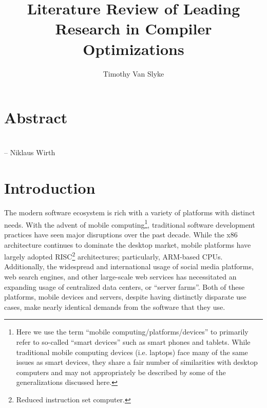 \documentclass[nobib]{tufte-handout}
\title{Literature Review of Leading Research in Compiler Optimizations}
\author{Timothy Van Slyke}
\begin{document}
\maketitle
\section*{Abstract}
\begin{abstract}
\lipsum[1]
\end{abstract}

\section*{}
\newline\noindent\hfill{-- Niklaus Wirth} \\
\section{Introduction}
The modern software ecosystem is rich with a variety of platforms with distinct needs.  With the advent of mobile computing\footnote{Here we use the term ``mobile computing/platforms/devices'' to primarily refer to so-called ``smart devices'' such as smart phones and tablets.  While traditional mobile computing devices (i.e. laptops) face many of the same issues as smart devices, they share a fair number of similarities with desktop computers and may not appropriately be described by some of the generalizations discussed here.}, traditional software development practices have seen major disruptions over the past decade.  While the x86 architecture continues to dominate the desktop market, mobile platforms have largely adopted RISC\footnote{Reduced instruction set computer.} architectures; particularly, ARM-based CPUs.  Additionally, the widespread and international usage of social media platforms, web search engines, and other large-scale web services has necessitated an expanding usage of centralized data centers, or ``server farms''.  Both of these platforms, mobile devices and servers, despite having distinctly disparate use cases, make nearly identical demands from the software that they use.
\end{document}
